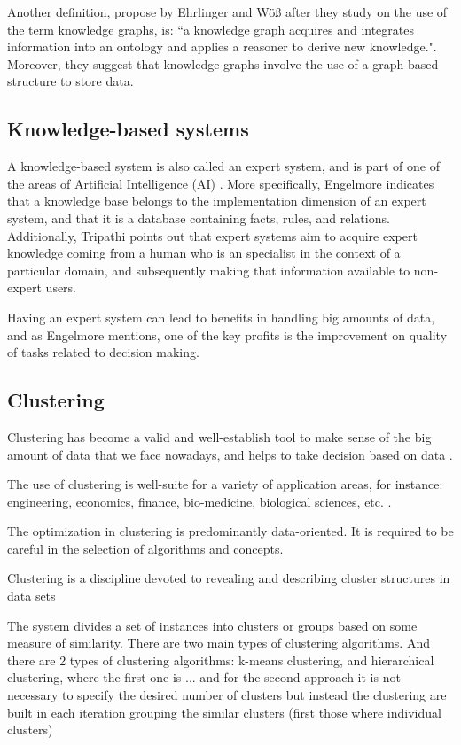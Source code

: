 \documentclass[runningheads]{llncs}
\begin{document}
Another definition, propose by Ehrlinger and W{\"o}{\ss} \cite{Ehrlinger} after they study on the use of the term knowledge graphs, is: ``a knowledge graph acquires and integrates information into an ontology and applies a reasoner to derive new knowledge.". Moreover, they suggest that knowledge graphs involve the use of a graph-based structure to store data.


\subsection{Knowledge-based systems} \label{knowledge-based}
A knowledge-based system is also called an expert system, and is part of one of the areas of Artificial Intelligence (AI) \cite{Tripathi}. More specifically, Engelmore \cite{Engelmore} indicates that a knowledge base belongs to the implementation dimension of an expert system, and that it is a database containing facts, rules, and relations. Additionally, Tripathi \cite{Tripathi} points out that expert systems aim to acquire expert knowledge coming from a human who is an specialist in the context of a particular domain, and subsequently making that information available to non-expert users.

Having an expert system can lead to benefits in handling big amounts of data, and as Engelmore \cite{Engelmore} mentions, one of the key profits is the improvement on quality of tasks related to decision making.


\subsection{Clustering} \label{clustering}
Clustering has become a valid and well-establish tool to make sense of the big amount of data that we face nowadays, and helps to take decision based on data \cite{Pedrycz}.

The use of clustering is well-suite for a variety of application areas, for instance: engineering, economics, finance, bio-medicine, biological sciences, etc. \cite{Pedrycz}.

The optimization in clustering is predominantly data-oriented. \cite{Pedrycz}
It is required to be careful in the selection of algorithms and concepts.

Clustering is a discipline devoted to revealing and describing cluster structures in data sets\cite{Mirkin}

The system divides a set of instances into clusters or groups based on some measure of similarity. There are two main types of clustering algorithms. And there are 2 types of clustering algorithms: k-means clustering, and hierarchical clustering, where the first one is ... and for the second approach it is not necessary to specify the desired number of clusters but instead the clustering are built in each iteration grouping  the similar clusters (first those where individual clusters)\cite{Zacharski}
\end{document}
